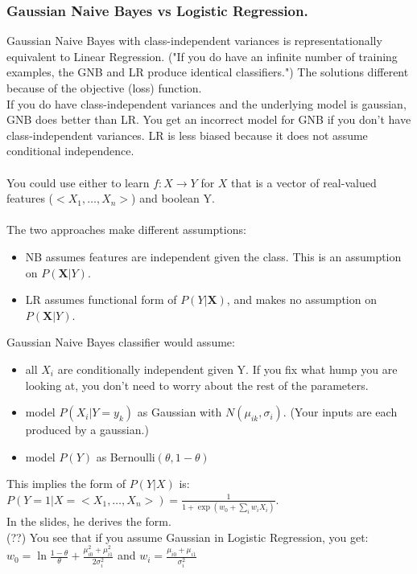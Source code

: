 \subsubsection{Gaussian Naive Bayes vs Logistic Regression.}
Gaussian Naive Bayes with class-independent variances is representationally equivalent to Linear Regression.
("If you do have an infinite number of training examples, the GNB and LR produce identical classifiers.")  %
The solutions different because of the objective (loss) function.  \hfill \\

If you do have class-independent variances and the underlying model is gaussian, GNB does better than LR.
You get an incorrect model for GNB if you don't have class-independent variances.  %
LR is less biased because it does not assume conditional independence.  %
 \hfill \\  \hfill \\

You could use either to learn $ f: X \rightarrow Y$ for $X$ that is a vector of real-valued features ($< X_1, \dots, X_n >$) and boolean Y. \hfill \\ \hfill \\

The two approaches make different assumptions:   \hfill \\
\begin{itemize}
	\item NB assumes features are independent given the class.  This is an assumption on $P(\bm{X} | Y)$.
	\item LR assumes functional form of $P(Y|\bm{X})$, and makes no assumption on $P(\bm{X} | Y)$.
\end{itemize}

Gaussian Naive Bayes classifier would assume: \hfill \\
\begin{itemize}
	\item all $X_i$ are conditionally independent given Y.  
		If you fix what hump you are looking at, you don't need to worry about the rest of the parameters. 
	\item model $P(X_i | Y = y_k)$ as Gaussian with $N(\mu_{ik}, \sigma_i)$.  (Your inputs are each produced by a gaussian.)
	\item model $P(Y)$ as Bernoulli$(\theta, 1-\theta)$
\end{itemize} 
This implies the form of $P(Y|X)$ is:
$\displaystyle P(Y=1 | X= < X_1, \dots, X_n >) = \frac{1}{1 + \exp(w_0 + \sum_i w_i X_i)}$. \hfill \\
In the slides, he derives the form.   \hfill \\
(??)  You see that if you assume Gaussian in Logistic Regression, you get: \hfill \\
 $w_0 = \ln \frac{1 - \theta}{\theta} + \frac{\mu_{i0}^2 + \mu_{i1}^2}{2 \sigma_i^2}$ and $w_i = \frac{\mu_{i0} + \mu_{i1}}{\sigma_i^2}$
 
